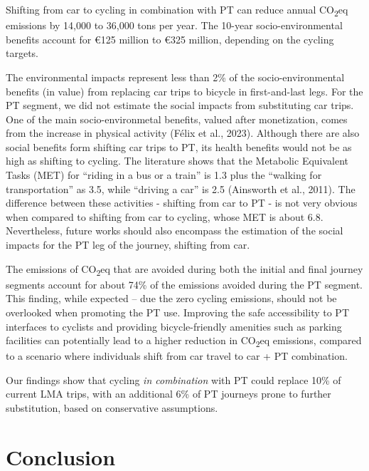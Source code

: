 \documentclass[review, doubleblind, 3p,
authoryear]{elsarticle} %
\begin{document}
Shifting from car to cycling in combination with PT can reduce annual
CO\textsubscript{2}eq emissions by 14,000 to 36,000 tons per year. The
10-year socio-environmental benefits account for €125 million to €325
million, depending on the cycling targets.

The environmental impacts represent less than 2\% of the
socio-environmental benefits (in value) from replacing car trips to
bicycle in first-and-last legs. For the PT segment, we did not estimate
the social impacts from substituting car trips. One of the main
socio-environmetal benefits, valued after monetization, comes from the
increase in physical activity (Félix et al., 2023). Although there are
also social benefits form shifting car trips to PT, its health benefits
would not be as high as shifting to cycling. The literature shows that
the Metabolic Equivalent Tasks (MET) for ``riding in a bus or a train''
is 1.3 plus the ``walking for transportation'' as 3.5, while ``driving a
car'' is 2.5 (Ainsworth et al., 2011). The difference between these
activities - shifting from car to PT - is not very obvious when compared
to shifting from car to cycling, whose MET is about 6.8. Nevertheless,
future works should also encompass the estimation of the social impacts
for the PT leg of the journey, shifting from car.

The emissions of CO\textsubscript{2}eq that are avoided during both the
initial and final journey segments account for about 74\% of the
emissions avoided during the PT segment. This finding, while expected --
due the zero cycling emissions, should not be overlooked when promoting
the PT use. Improving the safe accessibility to PT interfaces to
cyclists and providing bicycle-friendly amenities such as parking
facilities can potentially lead to a higher reduction in
CO\textsubscript{2}eq emissions, compared to a scenario where
individuals shift from car travel to car + PT combination.

Our findings show that cycling \emph{in combination} with PT could
replace 10\% of current LMA trips, with an additional 6\% of PT journeys
prone to further substitution, based on conservative assumptions.

\hypertarget{conclusion}{%
\section{Conclusion}\label{conclusion}}
\end{document}
